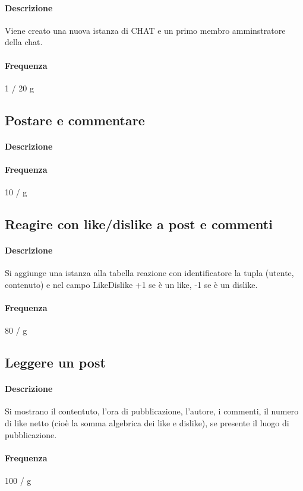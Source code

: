\documentclass[a4paper,12pt]{report}
\begin{document}
\paragraph{Descrizione} Viene creato una nuova istanza di CHAT e un primo membro amminstratore della chat.
\paragraph{Frequenza} 1 / 20 g

\subsection{Postare e commentare}
\paragraph{Descrizione}
\paragraph{Frequenza} 10 / g

\subsection{Reagire con like/dislike a post e commenti}
\paragraph{Descrizione} Si aggiunge una istanza alla tabella reazione con identificatore la tupla (utente, contenuto) e nel campo LikeDislike +1 se è un like, -1 se è un dislike.
\paragraph{Frequenza} 80 / g

\subsection{Leggere un post}
\paragraph{Descrizione} Si mostrano il contentuto, l'ora di pubblicazione, l'autore, i commenti, il numero di like netto (cioè la somma algebrica dei like e dislike), se presente il luogo di pubblicazione.
\paragraph{Frequenza} 100 / g
\end{document}
